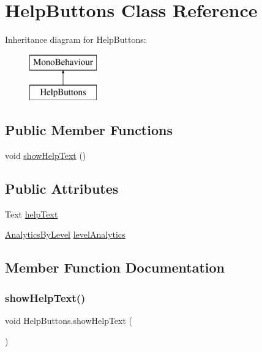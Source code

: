 \hypertarget{class_help_buttons}{}\section{Help\+Buttons Class Reference}
\label{class_help_buttons}
Inheritance diagram for Help\+Buttons\+:\begin{figure}[H]
\begin{center}
\leavevmode
\includegraphics[height=2.000000cm]{class_help_buttons}
\end{center}
\end{figure}
\subsection*{Public Member Functions}
\begin{DoxyCompactItemize}
\item 
void \hyperlink{class_help_buttons_a9726fde5562db44998eb42b897de48ac}{show\+Help\+Text} ()
\end{DoxyCompactItemize}
\subsection*{Public Attributes}
\begin{DoxyCompactItemize}
\item 
Text \hyperlink{class_help_buttons_ab183c5e89514936aac4fdb0fb27d3ba3}{help\+Text}
\item 
\hyperlink{class_analytics_by_level}{Analytics\+By\+Level} \hyperlink{class_help_buttons_ad47263338c2ea5515badf5dc8a8bb18b}{level\+Analytics}
\end{DoxyCompactItemize}


\subsection{Member Function Documentation}
\mbox{\label{class_help_buttons_a9726fde5562db44998eb42b897de48ac}} 
\subsubsection{\texorpdfstring{show\+Help\+Text()}{showHelpText()}}
{\footnotesize\ttfamily void Help\+Buttons.\+show\+Help\+Text (\begin{DoxyParamCaption}{ }\end{DoxyParamCaption})}



